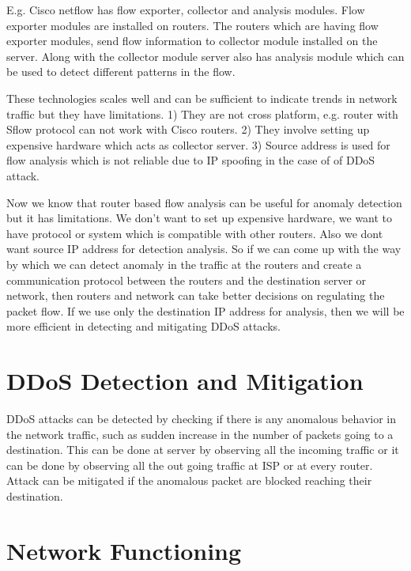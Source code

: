 \documentclass[10pt,oneside,a4paper]{article}
\begin{document}
E.g. Cisco netflow has flow exporter, collector and analysis modules. Flow exporter modules are installed on routers. The routers which are having flow exporter modules, send flow information to collector module installed on the server. Along with the collector module server also has analysis module which can be used to detect different patterns in the flow.\par

These technologies scales well and can be sufficient to indicate trends in network traffic but they have limitations. 1) They are not cross platform, e.g. router with Sflow protocol can not work with Cisco routers. 2) They involve setting up expensive hardware which acts as collector server. 3) Source address is used for flow analysis which is not reliable due to IP spoofing in the case of of DDoS attack.\par

Now we know that router based flow analysis can be useful for anomaly detection but it has limitations. We don't want to set up expensive hardware, we want to have protocol or system which is compatible with other routers. Also we dont want source IP address for detection analysis. So if we can come up with the way by which we can detect anomaly in the traffic at the routers and create a communication protocol between the routers and the destination server or network, then routers and network can take better decisions on regulating the packet flow. If we use only the destination IP address for analysis, then we will be more efficient in detecting and mitigating DDoS attacks.

\section{DDoS Detection and Mitigation}

DDoS attacks can be detected by checking if there is any anomalous behavior in the network traffic, such as sudden increase in the number of packets going to a destination. This can be done at server by observing all the incoming traffic or it can be done by observing all the out going traffic at ISP or at every router. Attack can be mitigated if the anomalous packet are blocked reaching their destination.

\section{Network Functioning}
\end{document}
